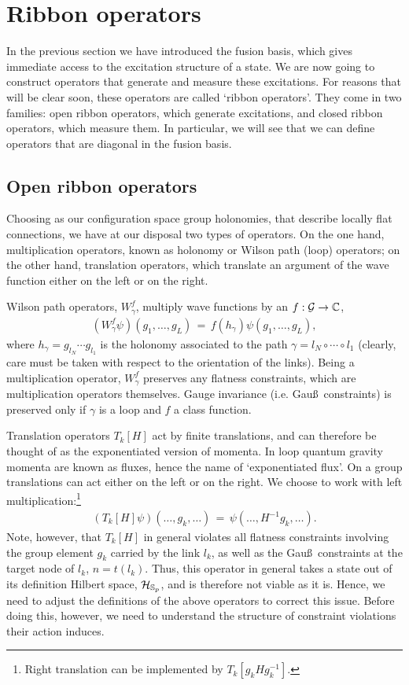 \documentclass[nofootinbib,superscriptaddress,eqsecnum,tightenlines,11pt]{revtex4-1}
\def\ba{\begin{eqnarray}}
\def\ea{\end{eqnarray}}
\renewcommand{\S}{{\mathbb S}}
\begin{document}
\section{Ribbon operators \label{sec_ribbons} }


In the previous section we have introduced the fusion basis, which gives immediate access to the excitation structure of a state.
We are now going to construct operators that generate and measure these excitations.
For reasons that will be clear soon, these operators are called `ribbon operators'.
They come in two families: open ribbon operators, which generate excitations, and closed ribbon operators, which measure them.
In particular, we will see that we can define operators that are diagonal in the fusion basis.

\subsection{ Open ribbon operators \label{oribbon}}

Choosing as our configuration space group holonomies, that describe locally flat connections, we have at our disposal two types of operators.
On the one hand, multiplication operators, known as holonomy or Wilson path (loop) operators; 
on the other hand, translation operators, which translate an argument of the wave function either on the left or on the right.

Wilson path operators, $W^f_\gamma$, multiply wave functions by an $f:{\cal G}\to\mathbb C$, 
\ba
(W^f_\gamma \psi ) (g_1, \ldots, g_L) \,=\, f( h_\gamma) \psi(g_1, \ldots, g_L),
\ea 
where $h_\gamma = g_{l_N} \cdots g_{l_1}$ is the holonomy associated to the path $\gamma= l_N \circ \cdots \circ l_1$ (clearly, care must be taken with respect to the orientation of the links).
Being a multiplication operator, $W^f_\gamma$ preserves any flatness constraints, which are multiplication operators themselves. 
Gauge invariance (i.e. Gau\ss~constraints) is preserved only if $\gamma$ is a loop and $f$ a class function. 

Translation operators $T_k[H]$ act by finite translations, and can therefore be thought of as the exponentiated version of momenta.
In loop quantum gravity momenta are known as fluxes, hence the name of `exponentiated flux'.
On a group translations can act either on the left or on the right. 
We choose to work with left multiplication:\footnote{Right translation can be implemented by $T_k[g_k H g_k^{-1}]$.}
 \ba
 (T_k[H]\psi)( \ldots, g_k, \ldots)  \,=\, \psi(\ldots, H^{-1} g_k, \ldots) .
\ea
Note, however, that $T_k[H]$ in general violates all flatness constraints involving the group element $g_k$ carried by the link $l_k$, as well as the Gau\ss~constraints at the target node of $l_k$, $n=t(l_k)$. 
Thus, this operator in general takes a state out of its definition Hilbert space, ${\cal H}_{\S_p}$, and is therefore not viable as it is.
{ Hence, we need to} adjust the definitions of the above operators to correct this issue.
Before doing this, however, we need to understand the structure of constraint violations their action induces.
\end{document}
